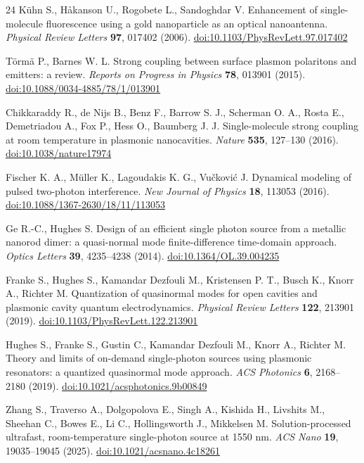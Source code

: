 \begin{thebibliography}{24}
 Kühn S., Håkanson U., Rogobete L., Sandoghdar V. Enhancement of single-molecule fluorescence using a gold nanoparticle as an optical nanoantenna. \textit{Physical Review Letters} \textbf{97}, 017402 (2006). \href{https://doi.org/10.1103/PhysRevLett.97.017402}{doi:10.1103/PhysRevLett.97.017402}

 Törmä P., Barnes W. L. Strong coupling between surface plasmon polaritons and emitters: a review. \textit{Reports on Progress in Physics} \textbf{78}, 013901 (2015). \href{https://doi.org/10.1088/0034-4885/78/1/013901}{doi:10.1088/0034-4885/78/1/013901}

 Chikkaraddy R., de Nijs B., Benz F., Barrow S. J., Scherman O. A., Rosta E., Demetriadou A., Fox P., Hess O., Baumberg J. J. Single-molecule strong coupling at room temperature in plasmonic nanocavities. \textit{Nature} \textbf{535}, 127--130 (2016). \href{https://doi.org/10.1038/nature17974}{doi:10.1038/nature17974}

 Fischer K. A., Müller K., Lagoudakis K. G., Vučković J. Dynamical modeling of pulsed two-photon interference. \textit{New Journal of Physics} \textbf{18}, 113053 (2016). \href{https://doi.org/10.1088/1367-2630/18/11/113053}{doi:10.1088/1367-2630/18/11/113053}

 Ge R.-C., Hughes S. Design of an efficient single photon source from a metallic nanorod dimer: a quasi-normal mode finite-difference time-domain approach. \textit{Optics Letters} \textbf{39}, 4235--4238 (2014). \href{https://doi.org/10.1364/OL.39.004235}{doi:10.1364/OL.39.004235}

 Franke S., Hughes S., Kamandar Dezfouli M., Kristensen P. T., Busch K., Knorr A., Richter M. Quantization of quasinormal modes for open cavities and plasmonic cavity quantum electrodynamics. \textit{Physical Review Letters} \textbf{122}, 213901 (2019). \href{https://doi.org/10.1103/PhysRevLett.122.213901}{doi:10.1103/PhysRevLett.122.213901}

 Hughes S., Franke S., Gustin C., Kamandar Dezfouli M., Knorr A., Richter M. Theory and limits of on-demand single-photon sources using plasmonic resonators: a quantized quasinormal mode approach. \textit{ACS Photonics} \textbf{6}, 2168--2180 (2019). \href{https://doi.org/10.1021/acsphotonics.9b00849}{doi:10.1021/acsphotonics.9b00849}

 Zhang S., Traverso A., Dolgopolova E., Singh A., Kishida H., Livshits M., Sheehan C., Bowes E., Li C., Hollingsworth J., Mikkelsen M. Solution-processed ultrafast, room-temperature single-photon source at 1550 nm. \textit{ACS Nano} \textbf{19}, 19035--19045 (2025). \href{https://doi.org/10.1021/acsnano.4c18261}{doi:10.1021/acsnano.4c18261}


\end{thebibliography}
